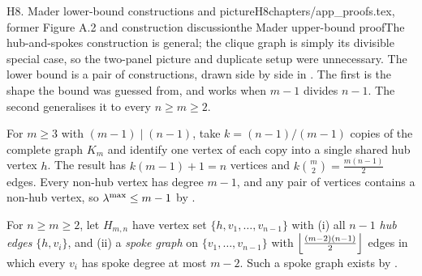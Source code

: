 \begin{offcutrewrite}{H8. Mader lower-bound constructions and picture}{H8}{chapters/app\_proofs.tex, former Figure A.2 and construction discussion}{the Mader upper-bound proof}{The hub-and-spokes construction is general; the clique graph is simply its divisible special case, so the two-panel picture and duplicate setup were unnecessary.}
The lower bound is a pair of constructions, drawn side by side in . The first is the shape the bound was guessed from, and works when $m - 1$ divides $n - 1$. The second generalises it to every $n \ge m \ge 2$.

\begin{construction}
For $m \ge 3$ with $(m-1) \mid (n-1)$, take $k = (n-1)/(m-1)$ copies of the complete graph $K_m$ and identify one vertex of each copy into a single shared hub vertex $h$. The result has $k(m-1) + 1 = n$ vertices and $k \binom{m}{2} = \frac{m(n-1)}{2}$ edges. Every non-hub vertex has degree $m - 1$, and any pair of vertices contains a non-hub vertex, so $\lambda^{\max} \le m-1$ by .
\end{construction}

\begin{construction}
For $n \ge m \ge 2$, let $H_{m,n}$ have vertex set $\{h, v_1, \ldots, v_{n-1}\}$ with
(i) all $n-1$ \emph{hub edges} $\{h, v_i\}$, and
(ii) a \emph{spoke graph} on $\{v_1, \ldots, v_{n-1}\}$ with $\left\lfloor \frac{(m-2)(n-1)}{2} \right\rfloor$ edges in which every $v_i$ has spoke degree at most $m-2$. Such a spoke graph exists by .
\end{construction}


\end{offcutrewrite}

